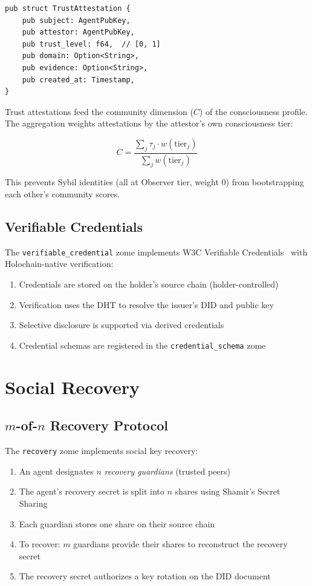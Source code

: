 \documentclass[11pt,twocolumn]{article}
\begin{document}
\begin{lstlisting}
pub struct TrustAttestation {
    pub subject: AgentPubKey,
    pub attestor: AgentPubKey,
    pub trust_level: f64,  // [0, 1]
    pub domain: Option<String>,
    pub evidence: Option<String>,
    pub created_at: Timestamp,
}
\end{lstlisting}

Trust attestations feed the community dimension ($C$) of the consciousness
profile. The aggregation weights attestations by the attestor's own
consciousness tier:

\begin{equation}
  C = \frac{\sum_{j} \tau_j \cdot w(\text{tier}_j)}{\sum_{j} w(\text{tier}_j)}
\end{equation}

This prevents Sybil identities (all at Observer tier, weight 0) from
bootstrapping each other's community scores.

\subsection{Verifiable Credentials}

The \texttt{verifiable\_credential} zome implements W3C Verifiable
Credentials~\cite{w3cvc} with Holochain-native verification:

\begin{enumerate}[nosep]
  \item Credentials are stored on the holder's source chain (holder-controlled)
  \item Verification uses the DHT to resolve the issuer's DID and public key
  \item Selective disclosure is supported via derived credentials
  \item Credential schemas are registered in the \texttt{credential\_schema} zome
\end{enumerate}

\section{Social Recovery}

\subsection{$m$-of-$n$ Recovery Protocol}

The \texttt{recovery} zome implements social key recovery:

\begin{enumerate}[nosep]
  \item An agent designates $n$ \emph{recovery guardians} (trusted peers)
  \item The agent's recovery secret is split into $n$ shares using Shamir's
    Secret Sharing
  \item Each guardian stores one share on their source chain
  \item To recover: $m$ guardians provide their shares to reconstruct the
    recovery secret
  \item The recovery secret authorizes a key rotation on the DID document
\end{enumerate}
\end{document}
